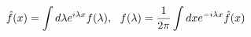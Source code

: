 \begin{equation}
\hat{f}(x)=\int d\lambda e^{i\lambda x}f(\lambda),~~f(\lambda)={1\over
  2\pi}
\int dx e^{-i\lambda x}\hat{f}(x)
\end{equation}

